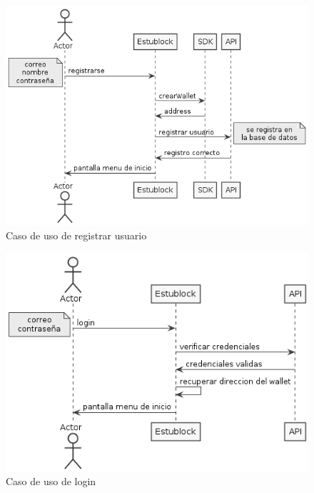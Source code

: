 \begin{figure}[h!]
  \centering
  \includegraphics[width=1\linewidth]{figs/Desarrollo/CasosUso/registro}
  \caption[Caso de uso de registrar usuario]{Caso de uso de registrar usuario}
  \label{fig:casoRegistro}
\end{figure}

\begin{figure}[h!]
  \centering
  \includegraphics[width=1\linewidth]{figs/Desarrollo/CasosUso/login}
  \caption[Caso de uso de login]{Caso de uso de login}
  \label{fig:casoLogin}
\end{figure}

